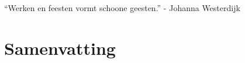 \begin{savequote}[75mm]
``Werken en feesten vormt schoone geesten.'' - Johanna Westerdijk
\end{savequote}

\chapter{Samenvatting}\label{samenvatting}
\setcounter{figure}{-1}
\setcounter{table}{-1}
\setcounter{section}{-1}
\setcounter{NAT@ctr}{-1}
